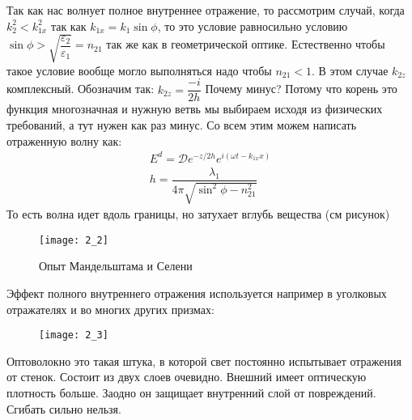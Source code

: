 	Так как нас волнует полное внутреннее отражение, то рассмотрим случай, когда $k_2^2 < k_{1x}^2 $ так как $k_{1x} = k_1 \sin \phi$, то это условие равносильно условию $\sin \phi > \sqrt{\dfrac{\varepsilon_2}{\varepsilon_1}} = n_{21}$ так же как в геометрической оптике. Естественно чтобы такое условие вообще могло выполняться надо чтобы $n_{21}<1$. В этом случае $k_{2z}$ комплексный. Обозначим так: $k_{2z} = \dfrac{-i}{2h}$ Почему минус? Потому что корень это функция многозначная и нужную ветвь мы выбираем исходя из физических требований, а тут нужен как раз минус. Со всем этим можем написать отраженную волну как:
	\begin{align*}
	E^{d} = \mathcal{D}e^{-z/2h} e^{i(\omega t - k_{1x} x)}\\
	h = \dfrac{\lambda_1}{4\pi \sqrt{\sin^2 \phi  - n_{21}^2}}
	\end{align*}
	То есть волна идет вдоль границы, но затухает вглубь вещества (см рисунок)
	\begin{figure}[H]
		\centering
		\caption{Опыт Мандельштама и Селени}
		\texttt{[image: 2\_2]}
	
	\end{figure}
	Эффект полного внутреннего отражения используется например в уголковых отражателях и во многих других призмах:
		\begin{figure}[H]
			\centering
			\texttt{[image: 2\_3]}
		\end{figure}
	Оптоволокно это такая штука, в которой свет постоянно испытывает отражения от стенок. Состоит из двух слоев очевидно. Внешний имеет оптическую плотность больше. Заодно он защищает внутренний слой от повреждений. Сгибать сильно нельзя.